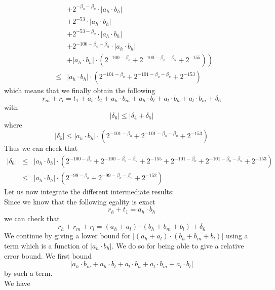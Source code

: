 \documentclass[a4paper,10pt,twoside]{article}
\newenvironment{proof}[1][Proof]{\begin{trivlist}
\item[\hskip \labelsep {\bfseries #1}]}{\end{trivlist}}
\newcommand{\hi}{\ensuremath{\mathit{h}}}
\newcommand{\mi}{\ensuremath{\mathit{m}}}
\newcommand{\lo}{\ensuremath{\mathit{l}}}
\begin{document}
\begin{proof}
\begin{eqnarray*}
& & + 2^{-\beta_o-\beta_u} \cdot \left \vert a_\hi \cdot b_\hi \right \vert \\
& & + 2^{-53} \cdot \left \vert a_\hi \cdot b_\hi \right \vert \\
& & + 2^{-53-\beta_o} \cdot \left \vert a_\hi \cdot b_\hi \right \vert \\
& & + 2^{-106-\beta_o-\beta_u} \cdot \left \vert a_\hi \cdot b_\hi \right \vert \\
& & \left. + \left \vert a_\hi \cdot b_\hi \right \vert \cdot \left( 2^{-100-\beta_o} + 2^{-100-\beta_o-\beta_u} + 2^{-155} \right) \right) \\
& \leq & \left \vert a_\hi \cdot b_\hi \right \vert \cdot \left( 2^{-101-\beta_o} + 2^{-101-\beta_o-\beta_u} + 2^{-153} \right)
\end{eqnarray*}
which means that we finally obtain the following
$$r_\mi + r_\lo = t_1 + a_\lo \cdot b_\lo + a_\hi \cdot b_\mi + a_\hi \cdot b_\lo + a_\lo \cdot b_\hi + a_\lo \cdot b_\mi + \delta_6$$
with
$$\left \vert \delta_6 \right \vert \leq \left \vert \delta_4 + \delta_5 \right \vert$$
where
$$\left \vert \delta_5 \right \vert \leq
\left \vert a_\hi \cdot b_\hi \right \vert \cdot \left( 2^{-101-\beta_o} + 2^{-101-\beta_o-\beta_u} + 2^{-153} \right)$$
Thus we can check that
\begin{eqnarray*}
\left \vert \delta_6 \right \vert & \leq &
\left \vert a_\hi \cdot b_\hi \right \vert \cdot \left( 2^{-100-\beta_o} + 2^{-100-\beta_o-\beta_u} + 2^{-155} +
2^{-101-\beta_o} + 2^{-101-\beta_o-\beta_u} + 2^{-153} \right) \\
& \leq & \left \vert a_\hi \cdot b_\hi \right \vert \cdot \left( 2^{-99-\beta_o} + 2^{-99-\beta_o-\beta_u} + 2^{-152} \right)
\end{eqnarray*}
Let us now integrate the different intermediate results:\\
Since we know that the following egality is exact
$$r_\hi + t_1 = a_\hi \cdot b_\hi$$
we can check that
$$r_\hi + r_\mi + r_\lo = \left( a_\hi + a_\lo \right) \cdot \left( b_\hi + b_\mi + b_\lo \right) + \delta_6$$
We continue by giving a lower bound for
$\left \vert \left( a_\hi + a_\lo \right) \cdot \left( b_\hi + b_\mi + b_\lo \right) \right \vert$
using a term which is a function of $\left \vert a_\hi \cdot b_\hi \right \vert$. We do so for being able to give
a relative error bound.
We first bound $$\left \vert a_\hi \cdot b_\mi + a_\hi \cdot b_\lo + a_\lo \cdot b_\hi + a_\lo \cdot b_\mi + a_\lo \cdot b_\lo \right \vert$$
by such a term.\\
We have
\begin{eqnarray*}

\end{eqnarray*}
\end{proof}
\end{document}

